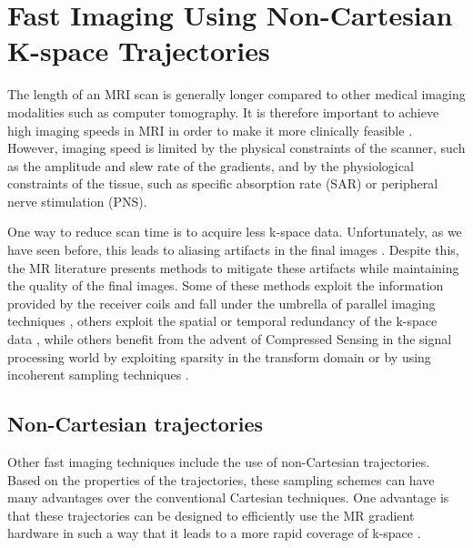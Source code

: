 \hfill 

\section{Fast Imaging Using Non-Cartesian K-space Trajectories}\label{chapterlabel2sec13}

The length of an MRI scan is generally longer compared to other medical imaging modalities such as computer tomography.
It is therefore important to achieve high imaging speeds in MRI in order to make it more clinically feasible \cite{Cohen1991}.
However, imaging speed is limited by the physical constraints of the scanner, such as the amplitude and slew rate of the gradients, and by the physiological constraints of the tissue, such as specific absorption rate (SAR) or peripheral nerve stimulation (PNS).

\hfill

One way to reduce scan time is to acquire less k-space data.
Unfortunately, as we have seen before, this leads to aliasing artifacts in the final images \cite{Pusey1988}.
Despite this, the MR literature presents methods to mitigate these artifacts while maintaining the quality of the final images.
Some of these methods exploit the information provided by the receiver coils and fall under the umbrella of parallel imaging techniques \cite{Griswold2002} \cite{Pruessmann2001} \cite{Pruessmann1999} \cite{Seiberlich2008}, 
others exploit the spatial or temporal redundancy of the k-space data \cite{Tsao2012} \cite{Jung2009} \cite{Tsao2003},
while others benefit from the advent of Compressed Sensing in the signal processing world by exploiting sparsity in the transform domain \cite{Lustig2007} \cite{Pedersen2009} or by using incoherent sampling techniques \cite{Candes2006} \cite{Haldar2011}.

\hfill

\subsection{Non-Cartesian trajectories}

Other fast imaging techniques include the use of non-Cartesian trajectories.
Based on the properties of the trajectories, these sampling schemes can have many advantages over the conventional Cartesian techniques.
One advantage is that these trajectories can be designed to efficiently use the MR gradient hardware in such a way that it leads to a more rapid coverage of k-space \cite{Wright2014}.

